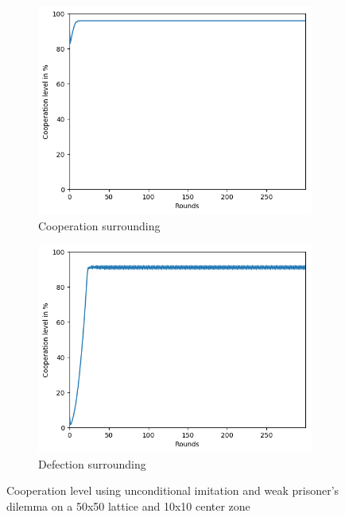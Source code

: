 \documentclass[letterpaper]{article}
\begin{document}
\begin{figure}[H]
    \begin{subfigure}{.5\textwidth}
        \centering
        \includegraphics[width=1\linewidth]{images/assign2/part31-coop/coop.png}
        \caption{Cooperation surrounding}
        \label{fig:part31-coop}
    \end{subfigure}
    \begin{subfigure}{.5\textwidth}
        \centering
        \includegraphics[width=1\linewidth]
        {images/assign2/part31-defect/coop.png}
        \caption{Defection surrounding}
        \label{fig:part31-defect}
    \end{subfigure}
    \caption{Cooperation level using unconditional imitation and
    weak prisoner's dilemma on a 50x50 lattice and 10x10 center zone}
    \label{fig:50part1}
\end{figure}
\end{document}
